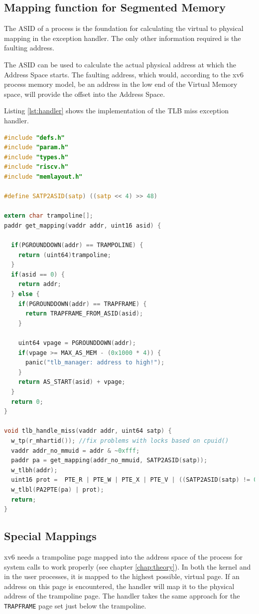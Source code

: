 \subsection{Mapping function for Segmented Memory}
The ASID of a process is the foundation for calculating the virtual to physical mapping in the exception handler.
The only other information required is the faulting address.

The ASID can be used to calculate the actual physical address at which the Address Space starts.
The faulting address, which would, according to the xv6 process memory model, be an address in the low
end of the Virtual Memory space, will provide the offset into the Address Space.

Listing \ref{lst:handler} shows the implementation of the TLB miss exception handler.

\begin{lstlisting}[language=c,float=h!,basicstyle=\footnotesize,
    label={lst:handler}, caption={\textbf{TLB Miss Exception Handler}}]
#include "defs.h"
#include "param.h"
#include "types.h"
#include "riscv.h"
#include "memlayout.h"

#define SATP2ASID(satp) ((satp << 4) >> 48)

extern char trampoline[];
paddr get_mapping(vaddr addr, uint16 asid) {

  if(PGROUNDDOWN(addr) == TRAMPOLINE) {
    return (uint64)trampoline;
  }
  if(asid == 0) {
    return addr;
  } else {
    if(PGROUNDDOWN(addr) == TRAPFRAME) {
      return TRAPFRAME_FROM_ASID(asid);
    }

    uint64 vpage = PGROUNDDOWN(addr);
    if(vpage >= MAX_AS_MEM - (0x1000 * 4)) {
      panic("tlb_manager: address to high!");
    }
    return AS_START(asid) + vpage;
  }
  return 0;
}

void tlb_handle_miss(vaddr addr, uint64 satp) {
  w_tp(r_mhartid()); //fix problems with locks based on cpuid()
  vaddr addr_no_mmuid = addr & ~0xfff;
  paddr pa = get_mapping(addr_no_mmuid, SATP2ASID(satp));
  w_tlbh(addr);
  uint16 prot =  PTE_R | PTE_W | PTE_X | PTE_V | ((SATP2ASID(satp) != 0) ? PTE_U : 0);
  w_tlbl(PA2PTE(pa) | prot);
  return;
}
\end{lstlisting}


\subsection{Special Mappings}
xv6 needs a trampoline page mapped into the address space of the process for system calls to work properly (see chapter \ref{chap:theory}).
In both the kernel and in the user processes, it is mapped to the highest possible, virtual page.
If an address on this page is encountered, the handler will map it to the physical address of the trampoline page.
The handler takes the same approach for the \texttt{TRAPFRAME} page set just below the trampoline.

